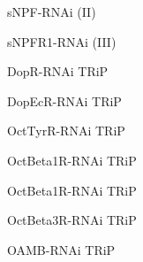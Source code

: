 \documentclass[17pt]{extarticle}
\begin{document}
\newpage{}
\vspace*{\fill}\begin{normalsize}
sNPF-RNAi (II) \\[0.5em]
\end{normalsize}
\footnotesize
\vspace*{\fill}
\newpage{}
\vspace*{\fill}\begin{small}
sNPFR1-RNAi (III) \\[0.5em]
\end{small}
\footnotesize
\vspace*{\fill}
\newpage{}
\vspace*{\fill}\begin{normalsize}
DopR-RNAi TRiP \\[0.5em]
\end{normalsize}
\footnotesize
\vspace*{\fill}
\newpage{}
\vspace*{\fill}\begin{small}
DopEcR-RNAi TRiP \\[0.5em]
\end{small}
\footnotesize
\vspace*{\fill}
\newpage{}
\vspace*{\fill}\begin{small}
OctTyrR-RNAi TRiP \\[0.5em]
\end{small}
\footnotesize
\vspace*{\fill}
\newpage{}
\vspace*{\fill}\begin{small}
OctBeta1R-RNAi TRiP \\[0.5em]
\end{small}
\footnotesize
\vspace*{\fill}
\newpage{}
\vspace*{\fill}\begin{small}
OctBeta1R-RNAi TRiP \\[0.5em]
\end{small}
\footnotesize
\vspace*{\fill}
\newpage{}
\vspace*{\fill}\begin{small}
OctBeta3R-RNAi TRiP \\[0.5em]
\end{small}
\footnotesize
\vspace*{\fill}
\newpage{}
\vspace*{\fill}\begin{normalsize}
OAMB-RNAi TRiP \\[0.5em]
\end{normalsize}
\end{document}
